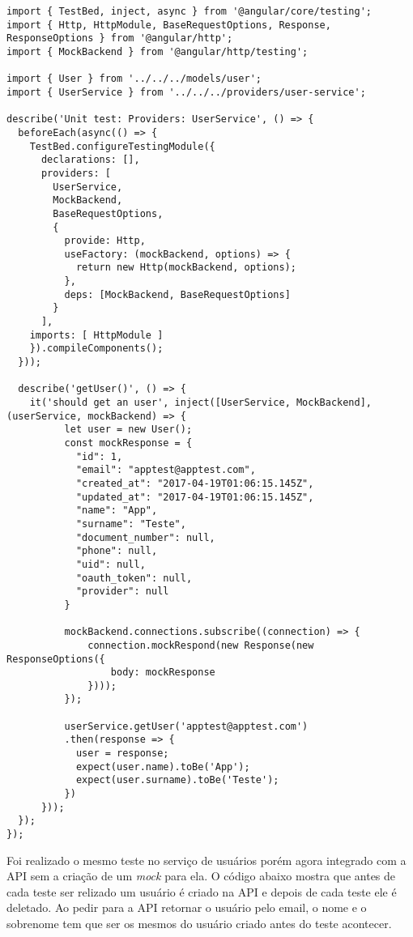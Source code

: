 \medskip
\begin{lstlisting}
import { TestBed, inject, async } from '@angular/core/testing';
import { Http, HttpModule, BaseRequestOptions, Response, ResponseOptions } from '@angular/http';
import { MockBackend } from '@angular/http/testing';

import { User } from '../../../models/user';
import { UserService } from '../../../providers/user-service';

describe('Unit test: Providers: UserService', () => {
  beforeEach(async(() => {
    TestBed.configureTestingModule({
      declarations: [],
      providers: [
        UserService,
        MockBackend,
        BaseRequestOptions,
        {
          provide: Http,
          useFactory: (mockBackend, options) => {
            return new Http(mockBackend, options);
          },
          deps: [MockBackend, BaseRequestOptions]
        }
      ],
    imports: [ HttpModule ]
    }).compileComponents();
  }));

  describe('getUser()', () => {
    it('should get an user', inject([UserService, MockBackend], (userService, mockBackend) => {
          let user = new User();
          const mockResponse = {
            "id": 1,
            "email": "apptest@apptest.com",
            "created_at": "2017-04-19T01:06:15.145Z",
            "updated_at": "2017-04-19T01:06:15.145Z",
            "name": "App",
            "surname": "Teste",
            "document_number": null,
            "phone": null,
            "uid": null,
            "oauth_token": null,
            "provider": null
          }

          mockBackend.connections.subscribe((connection) => {
              connection.mockRespond(new Response(new ResponseOptions({
                  body: mockResponse
              })));
          });

          userService.getUser('apptest@apptest.com')
          .then(response => {
            user = response;
            expect(user.name).toBe('App');
            expect(user.surname).toBe('Teste');
          })
      }));
  });
});
\end{lstlisting}

Foi realizado o mesmo teste no serviço de usuários porém agora integrado com a API sem a criação de um \textit{mock} para ela.
O código abaixo mostra que antes de cada teste ser relizado um usuário é criado na API e depois de cada teste ele é deletado.
Ao pedir para a API retornar o usuário pelo email, o nome e o sobrenome tem que ser os mesmos do usuário criado antes do teste acontecer.


